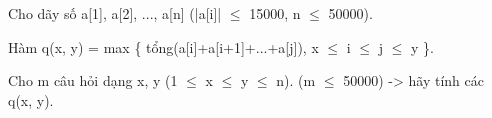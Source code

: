 Cho dãy số a[1], a[2], ..., a[n] (|a[i]|  $\le$  15000, n  $\le$  50000).  

   Hàm q(x, y) = max \{ tổng(a[i]+a[i+1]+...+a[j]), x  $\le$  i  $\le$  j  $\le$  y \}.  

   Cho m câu hỏi dạng x, y (1  $\le$  x  $\le$  y  $\le$  n). (m  $\le$  50000) -> hãy tính các q(x, y).   
\\
\\